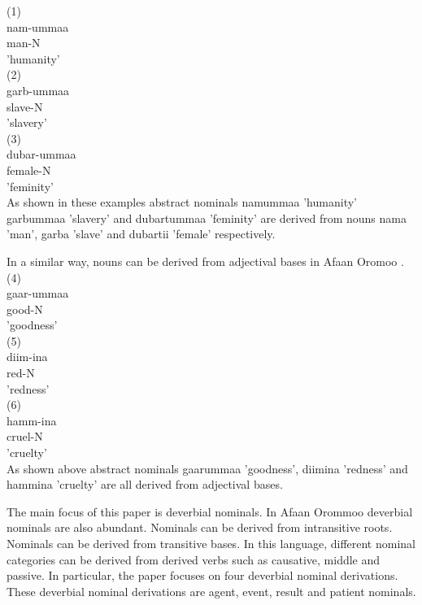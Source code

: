 \documentclass[11pt,a4paper]{article}
\begin{document}
(1)\\
\indent nam-ummaa \\
\indent man-N\\
\indent 'humanity'\\

(2)\\
\indent garb-ummaa\\
\indent slave-N\\
\indent 'slavery'\\

(3)\\
\indent dubar-ummaa\\
\indent female-N\\
\indent 'feminity'\\

As shown in these examples abstract nominals namummaa 'humanity' garbummaa 'slavery' and dubartummaa 'feminity' are derived from nouns nama 'man', garba 'slave' and dubartii 'female' respectively. 

In a similar way, nouns can be derived from adjectival bases in Afaan Oromoo \cite{gaddisa2001,temesgen1985,tolemariam2011,tolemariam2009}. \\

(4) \\
\indent gaar-ummaa\\
\indent good-N\\
\indent 'goodness'\\

(5)\\
\indent diim-ina\\
\indent red-N\\
\indent 'redness'\\

(6)\\
\indent hamm-ina\\
\indent cruel-N\\
\indent 'cruelty'\\

As shown above abstract nominals gaarummaa 'goodness', diimina 'redness' and hammina 'cruelty' are all derived from adjectival bases. 

The main focus of this paper is deverbial nominals. In Afaan Orommoo deverbial nominals are also abundant. Nominals can be derived from intransitive roots. Nominals can be derived from transitive bases. In this language, different nominal categories can be derived from derived verbs such as causative, middle and passive. In particular, the paper focuses on four deverbial nominal derivations. These deverbial nominal derivations are agent, event, result and patient nominals. 
\end{document}
